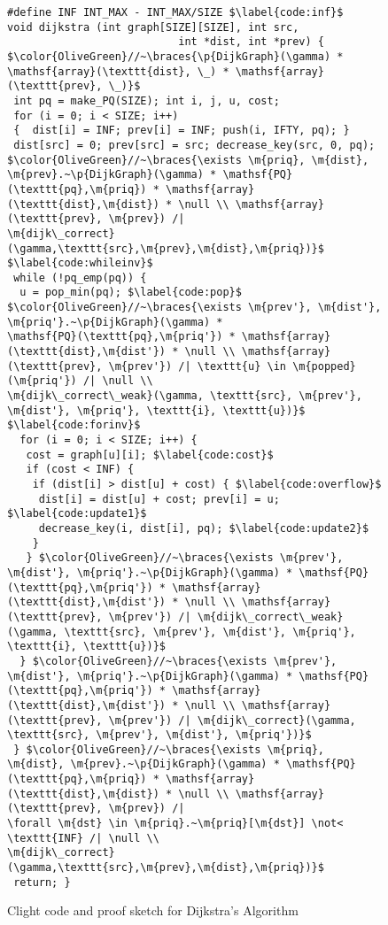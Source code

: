 
\begin{figure}[t]

\begin{lstlisting}[mathescape=true,showlines=true]
#define INF INT_MAX - INT_MAX/SIZE $\label{code:inf}$
void dijkstra (int graph[SIZE][SIZE], int src,
                           int *dist, int *prev) {
$\color{OliveGreen}//~\braces{\p{DijkGraph}(\gamma) *
\mathsf{array}(\texttt{dist}, \_) * \mathsf{array}(\texttt{prev}, \_)}$
 int pq = make_PQ(SIZE); int i, j, u, cost;
 for (i = 0; i < SIZE; i++)
 {  dist[i] = INF; prev[i] = INF; push(i, IFTY, pq); }
 dist[src] = 0; prev[src] = src; decrease_key(src, 0, pq);
$\color{OliveGreen}//~\braces{\exists \m{priq}, \m{dist}, \m{prev}.~\p{DijkGraph}(\gamma) * \mathsf{PQ}(\texttt{pq},\m{priq}) * \mathsf{array}(\texttt{dist},\m{dist}) * \null \\ \mathsf{array}(\texttt{prev}, \m{prev}) /|
\m{dijk\_correct}(\gamma,\texttt{src},\m{prev},\m{dist},\m{priq})}$ $\label{code:whileinv}$
 while (!pq_emp(pq)) {
  u = pop_min(pq); $\label{code:pop}$
$\color{OliveGreen}//~\braces{\exists \m{prev'}, \m{dist'}, \m{priq'}.~\p{DijkGraph}(\gamma) *
\mathsf{PQ}(\texttt{pq},\m{priq'}) * \mathsf{array}(\texttt{dist},\m{dist'}) * \null \\ \mathsf{array}(\texttt{prev}, \m{prev'}) /| \texttt{u} \in \m{popped}(\m{priq'}) /| \null \\
\m{dijk\_correct\_weak}(\gamma, \texttt{src}, \m{prev'}, \m{dist'}, \m{priq'}, \texttt{i}, \texttt{u})}$ $\label{code:forinv}$
  for (i = 0; i < SIZE; i++) {
   cost = graph[u][i]; $\label{code:cost}$
   if (cost < INF) {
    if (dist[i] > dist[u] + cost) { $\label{code:overflow}$
     dist[i] = dist[u] + cost; prev[i] = u; $\label{code:update1}$ 
     decrease_key(i, dist[i], pq); $\label{code:update2}$
    }
   } $\color{OliveGreen}//~\braces{\exists \m{prev'}, \m{dist'}, \m{priq'}.~\p{DijkGraph}(\gamma) * \mathsf{PQ}(\texttt{pq},\m{priq'}) * \mathsf{array}(\texttt{dist},\m{dist'}) * \null \\ \mathsf{array}(\texttt{prev}, \m{prev'}) /| \m{dijk\_correct\_weak}(\gamma, \texttt{src}, \m{prev'}, \m{dist'}, \m{priq'}, \texttt{i}, \texttt{u})}$
  } $\color{OliveGreen}//~\braces{\exists \m{prev'}, \m{dist'}, \m{priq'}.~\p{DijkGraph}(\gamma) * \mathsf{PQ}(\texttt{pq},\m{priq'}) * \mathsf{array}(\texttt{dist},\m{dist'}) * \null \\ \mathsf{array}(\texttt{prev}, \m{prev'}) /| \m{dijk\_correct}(\gamma, \texttt{src}, \m{prev'}, \m{dist'}, \m{priq'})}$
 } $\color{OliveGreen}//~\braces{\exists \m{priq}, \m{dist}, \m{prev}.~\p{DijkGraph}(\gamma) * \mathsf{PQ}(\texttt{pq},\m{priq}) * \mathsf{array}(\texttt{dist},\m{dist}) * \null \\ \mathsf{array}(\texttt{prev}, \m{prev}) /|
\forall \m{dst} \in \m{priq}.~\m{priq}[\m{dst}] \not< \texttt{INF} /| \null \\
\m{dijk\_correct}(\gamma,\texttt{src},\m{prev},\m{dist},\m{priq})}$
 return; }
\end{lstlisting}
\vspace{-1em}
\caption{Clight code and proof sketch for Dijkstra's Algorithm}
\vspace{-1em}
\label{fig:decorated}
\end{figure} 